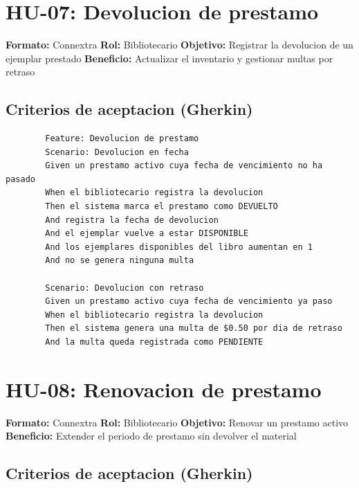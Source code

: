 \documentclass[
11pt,
a4paper,
]{report}
\begin{document}
	\hypertarget{hu-07-devolucion-de-prestamo}{%
		\section{HU-07: Devolucion de prestamo}\label{hu-07-devolucion-de-prestamo}}
	
	\textbf{Formato:} Connextra
	\textbf{Rol:} Bibliotecario
	\textbf{Objetivo:} Registrar la devolucion de un ejemplar prestado
	\textbf{Beneficio:} Actualizar el inventario y gestionar multas por retraso
	
	\hypertarget{criterios-de-aceptacion-gherkin-1}{%
		\subsection{Criterios de aceptacion (Gherkin)}\label{criterios-de-aceptacion-gherkin-1}}
	
	\begin{lstlisting}
		Feature: Devolucion de prestamo
		Scenario: Devolucion en fecha
		Given un prestamo activo cuya fecha de vencimiento no ha pasado
		When el bibliotecario registra la devolucion
		Then el sistema marca el prestamo como DEVUELTO
		And registra la fecha de devolucion
		And el ejemplar vuelve a estar DISPONIBLE
		And los ejemplares disponibles del libro aumentan en 1
		And no se genera ninguna multa
		
		Scenario: Devolucion con retraso
		Given un prestamo activo cuya fecha de vencimiento ya paso
		When el bibliotecario registra la devolucion
		Then el sistema genera una multa de $0.50 por dia de retraso
		And la multa queda registrada como PENDIENTE
	\end{lstlisting}
	
	\hypertarget{hu-08-renovacion-de-prestamo}{%
		\section{HU-08: Renovacion de prestamo}\label{hu-08-renovacion-de-prestamo}}
	
	\textbf{Formato:} Connextra
	\textbf{Rol:} Bibliotecario
	\textbf{Objetivo:} Renovar un prestamo activo
	\textbf{Beneficio:} Extender el periodo de prestamo sin devolver el material
	
	\hypertarget{criterios-de-aceptacion-gherkin-2}{%
		\subsection{Criterios de aceptacion (Gherkin)}\label{criterios-de-aceptacion-gherkin-2}}
	
\end{document}
